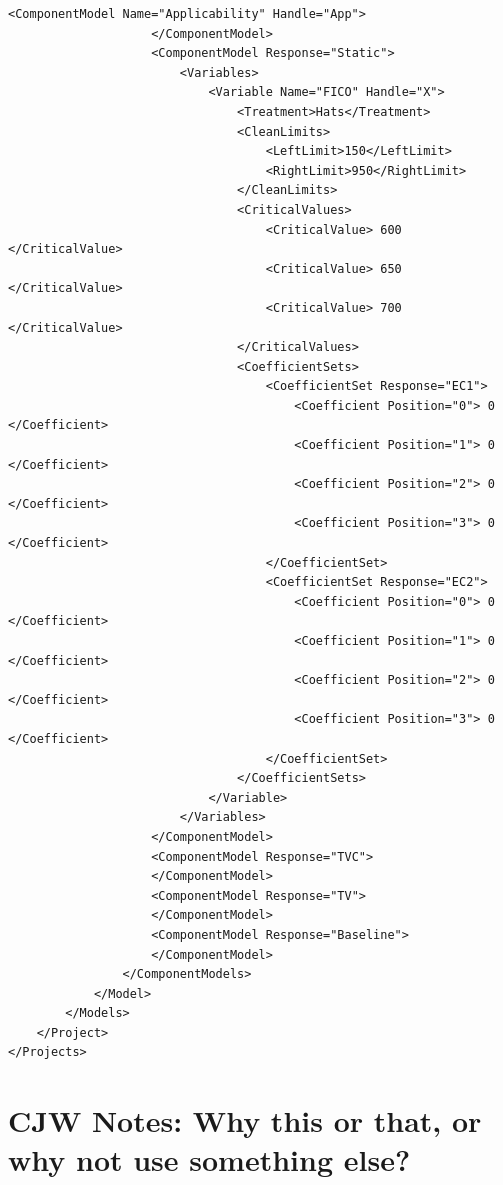 \documentclass[10pt]{article}
\begin{document}
\begin{Verbatim}[fontsize=\small,baselinestretch=0.75,formatcom=\color{red}]
                    <ComponentModel Name="Applicability" Handle="App">
                    </ComponentModel>
                    <ComponentModel Response="Static">
                        <Variables>
                            <Variable Name="FICO" Handle="X">
                                <Treatment>Hats</Treatment>
                                <CleanLimits>
                                    <LeftLimit>150</LeftLimit>
                                    <RightLimit>950</RightLimit>
                                </CleanLimits>
                                <CriticalValues>
                                    <CriticalValue> 600 </CriticalValue>
                                    <CriticalValue> 650 </CriticalValue>
                                    <CriticalValue> 700 </CriticalValue>
                                </CriticalValues>
                                <CoefficientSets>
                                    <CoefficientSet Response="EC1">
                                        <Coefficient Position="0"> 0 </Coefficient>
                                        <Coefficient Position="1"> 0 </Coefficient>
                                        <Coefficient Position="2"> 0 </Coefficient>
                                        <Coefficient Position="3"> 0 </Coefficient>
                                    </CoefficientSet>
                                    <CoefficientSet Response="EC2">
                                        <Coefficient Position="0"> 0 </Coefficient>
                                        <Coefficient Position="1"> 0 </Coefficient>
                                        <Coefficient Position="2"> 0 </Coefficient>
                                        <Coefficient Position="3"> 0 </Coefficient>
                                    </CoefficientSet>
                                </CoefficientSets>
                            </Variable>
                        </Variables>
                    </ComponentModel>
                    <ComponentModel Response="TVC">
                    </ComponentModel>
                    <ComponentModel Response="TV">
                    </ComponentModel>
                    <ComponentModel Response="Baseline">
                    </ComponentModel>
                </ComponentModels>
            </Model>
        </Models>
    </Project>
</Projects>
\end{Verbatim}



\ifcommentary


\section{\label{why} CJW Notes: Why this or that, or why not use something else?}
\end{document}
